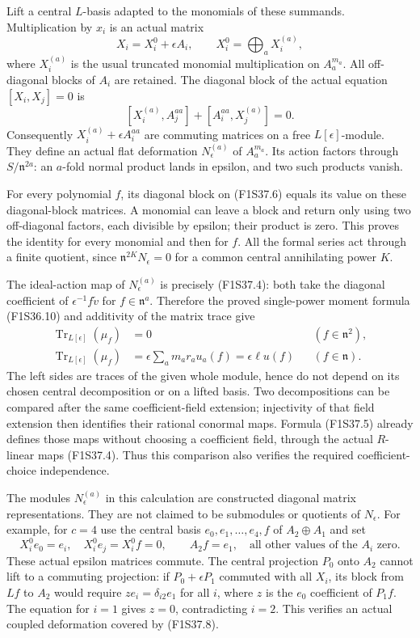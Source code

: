 Lift a central $L$-basis adapted to the
monomials of these summands. Multiplication
by $x_i$ is an actual matrix
\[
 X_i=X_i^0+\epsilon A_i,\qquad
 X_i^0=\bigoplus_a X_i^{(a)},
 \tag{F1S37.6}
\]
where $X_i^{(a)}$ is the usual truncated
monomial multiplication on $A_a^{m_a}$.
All off-diagonal blocks of $A_i$ are retained.
The diagonal block of the actual equation
$[X_i,X_j]=0$ is
\[
 [X_i^{(a)},A_j^{aa}]+[A_i^{aa},X_j^{(a)}]=0.
 \tag{F1S37.7}
\]
Consequently $X_i^{(a)}+\epsilon A_i^{aa}$
are commuting matrices on a free
$L[\epsilon]$-module. They define an actual
flat deformation $N_\epsilon^{(a)}$ of
$A_a^{m_a}$. Its action factors through
$S/\mathfrak n^{2a}$: an $a$-fold normal
product lands in epsilon, and two such
products vanish.

For every polynomial $f$, its diagonal
block on (F1S37.6) equals its value on
these diagonal-block matrices. A monomial
can leave a block and return only using
two off-diagonal factors, each divisible
by epsilon; their product is zero.
This proves the identity for every monomial
and then for $f$. All the formal series
act through a finite quotient, since
$\mathfrak n^{2K}N_\epsilon=0$ for a
common central annihilating power $K$.

The ideal-action map of
$N_\epsilon^{(a)}$ is precisely (F1S37.4):
both take the diagonal coefficient of
$\epsilon^{-1}f\widetilde v$ for
$f\in\mathfrak n^a$. Therefore the proved
single-power moment formula (F1S36.10)
and additivity of the matrix trace give
\[
\begin{aligned}
 \operatorname{Tr}_{L[\epsilon]}(\mu_f)&=0
                         &&(f\in\mathfrak n^2),\\
 \operatorname{Tr}_{L[\epsilon]}(\mu_f)
       &=\epsilon\sum_a m_a r_a u_a(f)
         =\epsilon\ell u(f)
                         &&(f\in\mathfrak n).
\end{aligned}
 \tag{F1S37.8}
\]
The left sides are traces of the given
whole module, hence do not depend on its
chosen central decomposition or on a lifted
basis. Two decompositions can be compared
after the same coefficient-field extension;
injectivity of that field extension then
identifies their rational conormal maps.
Formula (F1S37.5) already defines those
maps without choosing a coefficient field,
through the actual $R$-linear maps (F1S37.4).
Thus this comparison also verifies the
required coefficient-choice independence.

The modules $N_\epsilon^{(a)}$ in this
calculation are constructed diagonal
matrix representations. They are not
claimed to be submodules or quotients
of $N_\epsilon$. For example, for $c=4$
use the central basis $e_0,e_1,\ldots,e_4,f$
of $A_2\oplus A_1$ and set
\[
 X_i^0 e_0=e_i,\quad X_i^0 e_j=X_i^0 f=0,
 \qquad A_2 f=e_1,
 \quad\text{all other values of the }A_i\text{ zero}.
 \tag{F1S37.9}
\]
These actual epsilon matrices commute.
The central projection $P_0$ onto $A_2$
cannot lift to a commuting projection:
if $P_0+\epsilon P_1$ commuted with all
$X_i$, its block from $Lf$ to $A_2$
would require $z e_i=\delta_{i2}e_1$
for all $i$, where $z$ is the $e_0$
coefficient of $P_1f$. The equation for
$i=1$ gives $z=0$, contradicting $i=2$.
This verifies an actual coupled deformation
covered by (F1S37.8).

